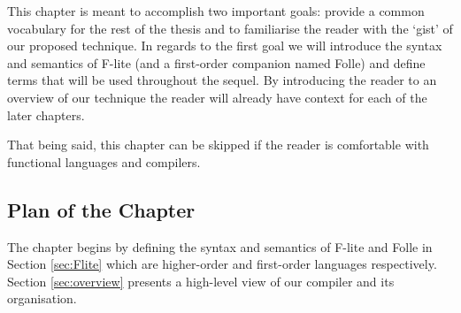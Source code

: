 This chapter is meant to accomplish two important goals: provide a common
vocabulary for the rest of the thesis and to familiarise the reader with the
`gist' of our proposed technique. In regards to the first goal we will
introduce the syntax and semantics of F-lite (and a first-order companion named
Folle) and define terms that will be used throughout the sequel. By introducing
the reader to an overview of our technique the reader will already have context
for each of the later chapters.

That being said, this chapter can be skipped if the reader is comfortable with
functional languages and compilers.

\subsection*{Plan of the Chapter}

The chapter begins by defining the syntax and semantics of F-lite and Folle in
Section \ref{sec:Flite} which are higher-order and first-order languages
respectively. Section \ref{sec:overview} presents a high-level view of our
compiler and its organisation.
